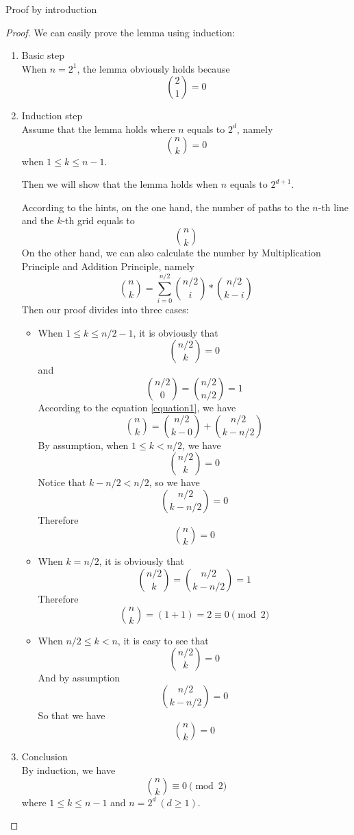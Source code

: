 \item Proof by introduction
\begin{proof}
We can easily prove the lemma using induction:
\begin{enumerate}
    \item Basic step\\
    When $\displaystyle n = 2^1$, the lemma obviously holds because
	\[\binom{2}{1} = 0\]
    \item Induction step\\
    Assume that the lemma holds where $n$ equals to $2^d$, namely
	\[\binom{n}{k} = 0\]
	when $1 \leq k \leq n - 1$.

	Then we will show that the lemma holds when $n$ equals to $2^{d + 1}$.

	According to the hints, on the one hand, the number of paths to the $n$-th line and the $k$-th grid equals to
	\[\binom{n}{k}\]
	On the other hand, we can also calculate the number by Multiplication Principle and Addition Principle, namely
	\begin{equation}\label{equation1}
	\binom{n}{k} = \sum_{i = 0}^{n / 2} \binom{n / 2}{i} * \binom{n / 2}{k - i}
	\end{equation}
	Then our proof divides into three cases:
	\begin{itemize}
		\item When $1 \leq k \leq n / 2 - 1$, it is obviously that
		\[\binom{n / 2}{k} = 0\]
		and
		\[\binom{n / 2}{0} = \binom{n / 2}{n / 2} = 1\]
		According to the equation \eqref{equation1}, we have
		\[\binom{n}{k} = \binom{n / 2}{k - 0} + \binom{n / 2}{k - n / 2}\]
		 By assumption, when $1 \leq k < n / 2$, we have
		\[\binom{n / 2}{k} = 0\]
		Notice that $k - n / 2 < n / 2$, so we have
		\[\binom{n / 2}{k - n / 2} = 0\]
		Therefore \[\displaystyle \binom{n}{k} = 0\]
		\item
		When $k = n / 2$, it is obviously that
		\[\binom{n / 2}{k} = \binom{n / 2}{k - n / 2} = 1\]
		Therefore
		\[\binom{n}{k} = (1 + 1) = 2 \equiv 0 \pmod{2}\]
		\item
		When $n / 2 \leq k < n$, it is easy to see that
		\[\binom{n / 2}{k} = 0\]
		And by assumption
		\[\binom{n / 2}{k - n / 2} = 0\]
		So that we have
		\[\binom{n}{k} = 0\]
	\end{itemize}

    \item Conclusion\\
	By induction, we have
    \[\binom{n}{k} \equiv 0 \pmod{2}\]
	where $1 \leq k \leq n - 1$ and $n = 2^d~(d \geq 1)$.
\end{enumerate}
\end{proof}
